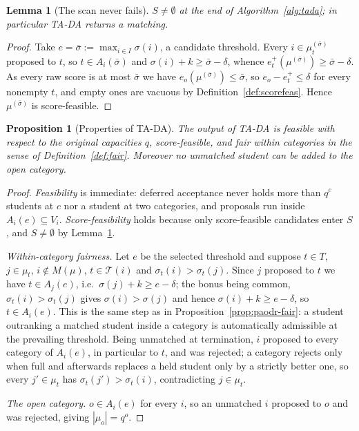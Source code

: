 \documentclass[a4paper,twoside]{article}
\newtheorem{lemma}{Lemma}
\newtheorem{proposition}{Proposition}
\theoremstyle{definition}
\renewcommand{\T}{\mathcal{T}}
\begin{document}
\begin{lemma}[The scan never fails]
\label{lem:tada-nonempty}
$S\neq\emptyset$ at the end of Algorithm~\ref{alg:tada}; in particular TA-DA returns a matching.
\end{lemma}

\begin{proof}
Take $e=\bar\sigma:=\max_{i\in I}\sigma(i)$, a candidate threshold. Every $i\in\mu^{(\bar\sigma)}_t$ proposed to $t$, so $t\in A_i(\bar\sigma)$ and $\sigma(i)+k\ge\bar\sigma-\delta$, whence $e_t^+(\mu^{(\bar\sigma)})\ge\bar\sigma-\delta$. As every raw score is at most $\bar\sigma$ we have $e_o(\mu^{(\bar\sigma)})\le\bar\sigma$, so $e_o-e_t^+\le\delta$ for every nonempty $t$, and empty ones are vacuous by Definition~\ref{def:scorefeas}. Hence $\mu^{(\bar\sigma)}$ is score-feasible.
\end{proof}

\begin{proposition}[Properties of TA-DA]
\label{prop:tada-props}
The output of TA-DA is feasible with respect to the original capacities $q$, score-feasible, and fair within categories in the sense of Definition~\ref{def:fair}. Moreover no unmatched student can be added to the open category.
\end{proposition}

\begin{proof}
\emph{Feasibility} is immediate: deferred acceptance never holds more than $q^c$ students at $c$ nor a student at two categories, and proposals run inside $A_i(e)\subseteq V_i$. \emph{Score-feasibility} holds because only score-feasible candidates enter $S$, and $S\neq\emptyset$ by Lemma~\ref{lem:tada-nonempty}.

\emph{Within-category fairness.} Let $e$ be the selected threshold and suppose $t\in T$, $j\in\mu_t$, $i\notin M(\mu)$, $t\in\T(i)$ and $\sigma_t(i)>\sigma_t(j)$. Since $j$ proposed to $t$ we have $t\in A_j(e)$, i.e.\ $\sigma(j)+k\ge e-\delta$; the bonus being common, $\sigma_t(i)>\sigma_t(j)$ gives $\sigma(i)>\sigma(j)$ and hence $\sigma(i)+k\ge e-\delta$, so $t\in A_i(e)$. This is the same step as in Proposition~\ref{prop:paodr-fair}: a student outranking a matched student inside a category is automatically admissible at the prevailing threshold. Being unmatched at termination, $i$ proposed to every category of $A_i(e)$, in particular to $t$, and was rejected; a category rejects only when full and afterwards replaces a held student only by a strictly better one, so every $j'\in\mu_t$ has $\sigma_t(j')>\sigma_t(i)$, contradicting $j\in\mu_t$.

\emph{The open category.} $o\in A_i(e)$ for every $i$, so an unmatched $i$ proposed to $o$ and was rejected, giving $|\mu_o|=q^o$.
\end{proof}
\end{document}

